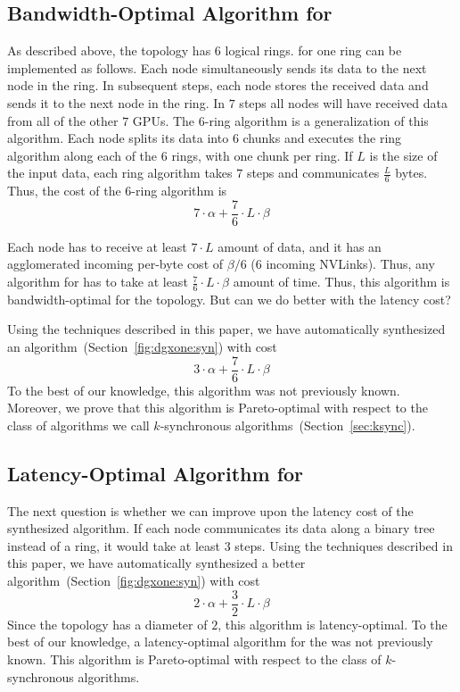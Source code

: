 \subsection{Bandwidth-Optimal Algorithm for \dgxone}
\label{sec:motivation:bw-optimal}
As described above, the \dgxone topology has $6$ logical rings. \allgather for one ring can be implemented as follows. Each node simultaneously sends its data to the next node in the ring. In subsequent steps, each node stores the received data and sends it to the next node in the ring. In $7$ steps all nodes will have received data from all of the other $7$ GPUs. The $6$-ring algorithm is a generalization of this algorithm. Each node splits its data into $6$ chunks and executes the ring algorithm along each of the $6$ rings, with one chunk per ring. If $L$ is the size of the input data, each ring algorithm takes $7$ steps and communicates $\frac{L}{6}$ bytes. Thus, the cost of the $6$-ring algorithm is
$$7\cdot \alpha + \frac{7}{6}\cdot L \cdot \beta$$

Each node has to receive at least $7 \cdot L$ amount of data, and it has an agglomerated incoming per-byte cost of $\beta/6$ (6 incoming NVLinks). Thus, any algorithm for \allgather has to take at least $\frac{7}{6}\cdot L \cdot \beta$ amount of time. Thus, this algorithm is bandwidth-optimal for the \dgxone topology. But can we do better with the latency cost?

Using the techniques described in this paper, we have automatically synthesized an algorithm~(Section~\ref{fig:dgxone:syn}) with cost $$3\cdot \alpha + \frac{7}{6}\cdot L \cdot \beta$$ To the best of our knowledge, this algorithm was not previously known. Moreover, we prove that this algorithm is Pareto-optimal with respect to the class of algorithms we call $k$-synchronous algorithms~(Section~\ref{sec:ksync}).

\subsection{Latency-Optimal Algorithm for \dgxone}
The next question is whether we can improve upon the latency cost of the synthesized algorithm. If each node communicates its data along a binary tree instead of a ring, it would take at least $3$ steps. Using the techniques described in this paper, we have automatically synthesized a better algorithm~(Section~\ref{fig:dgxone:syn}) with cost $$2\cdot \alpha + \frac{3}{2}\cdot L \cdot \beta$$
Since the \dgxone topology has a diameter of $2$, this algorithm is latency-optimal. To the best of our knowledge, a latency-optimal algorithm for the \dgxone was not previously known. This algorithm is Pareto-optimal with respect to the class of $k$-synchronous algorithms.

